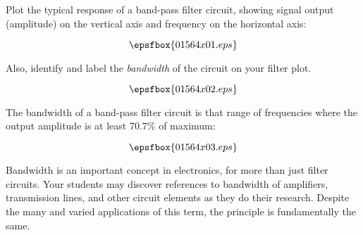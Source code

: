 

Plot the typical response of a band-pass filter circuit, showing signal output (amplitude) on the vertical axis and frequency on the horizontal axis:

$$\epsfbox{01564x01.eps}$$

Also, identify and label the {\it bandwidth} of the circuit on your filter plot.







$$\epsfbox{01564x02.eps}$$

The bandwidth of a band-pass filter circuit is that range of frequencies where the output amplitude is at least 70.7\% of maximum:

$$\epsfbox{01564x03.eps}$$







Bandwidth is an important concept in electronics, for more than just filter circuits.  Your students may discover references to bandwidth of amplifiers, transmission lines, and other circuit elements as they do their research.  Despite the many and varied applications of this term, the principle is fundamentally the same.




